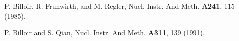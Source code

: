 
\begin{thebibliography}{99}
P. Billoir, R. Fruhwirth, and M. Regler, Nucl. Instr. And Meth. {\bf A241}, 115 (1985). 

P. Billoir and S. Qian, Nucl. Instr. And Meth. {\bf A311}, 139 (1991). 

\end{thebibliography}

